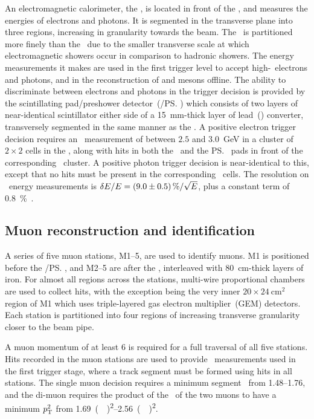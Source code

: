 An electromagnetic calorimeter, the \ecal, is located in front of the \hcal, 
and measures the energies of electrons and photons.
It is segmented in the transverse plane into three regions, increasing in 
granularity towards the beam.
The \ecal\ is partitioned more finely than the \hcal\ due to the smaller 
transverse scale at which electromagnetic showers occur in comparison to 
hadronic showers.
The energy measurements it makes are used in the first trigger level to accept 
high-\ET\ electrons and photons, and in the reconstruction of \Ppizero and 
\Peta mesons offline.
The ability to discriminate between electrons and photons in the trigger 
decision is provided by the scintillating pad/preshower detector~(\spd/\ps) 
which consists of two layers of near-identical scintillator either side of a 
\SI{15}{\milli\metre}-thick layer of lead~() converter, transversely 
segmented in the same manner as the \ecal.
A positive electron trigger decision requires an \ET\ measurement of between 
$2.5$ and \SI{3.0}{\GeV} in a cluster of $2\times2$ cells in the \ecal, along 
with hits in both the \spd\ and the \ps\ pads in front of the corresponding 
\ecal\ cluster.  A positive photon trigger decision is near-identical to this, 
except that no hits must be present in the corresponding \spd\ cells.
The resolution on \ecal\ energy measurements is $\unc{E}/E = \SI{9 \pm 
  0.5}{\percent}/\sqrt{E}$, plus a constant term of 
\SI{0.8}{\percent}~\cite{Perret:2015pla}.

\subsection{Muon reconstruction and identification}
\label{chap:intro:lhcb:muon}

A series of five muon stations, M1--5, are used to identify muons.
M1 is positioned before the \spd/\ps, and M2--5 are after the \hcal, 
interleaved with \SI{80}{\centi\metre}-thick layers of iron.
For almost all regions across the stations, multi-wire proportional chambers 
are used to collect hits, with the exception being the very inner 
$20\times\SI{24}{\centi\metre\squared}$ region of M1 which uses triple-layered 
gas electron multiplier~(GEM) detectors.
Each station is partitioned into four regions of increasing transverse 
granularity closer to the beam pipe.

A muon momentum of at least \SI{6}{\GeVc} is required for a full traversal of 
all five stations.
Hits recorded in the muon stations are used to provide \pT\ measurements used 
in the first trigger stage, where a track segment must be formed using hits in 
all stations.
The single muon decision requires a minimum segment \pT\ from 
\SIrange{1.48}{1.76}{\GeVc}, and the di-muon requires the product of the \pT\ 
of the two muons to have a minimum $\pT^{2}$ from 
\SIrange{1.69}{2.56}{(\GeVc)\squared}.

